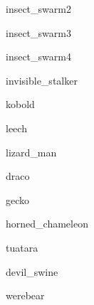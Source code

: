 \documentclass[letterpaper,serif]{module}
\begin{document}
\begin{newmonster}{insect_swarm2}\end{newmonster}

\begin{newmonster}{insect_swarm3}\end{newmonster}

\begin{newmonster}{insect_swarm4}\end{newmonster}

\begin{newmonster}{invisible_stalker}\end{newmonster}

\begin{newmonster}{kobold}\end{newmonster}

\begin{newmonster}{leech}\end{newmonster}

\begin{newmonster}{lizard_man}\end{newmonster}

\begin{newmonster}{draco}\end{newmonster}

\begin{newmonster}{gecko}\end{newmonster}

\begin{newmonster}{horned_chameleon}\end{newmonster}

\begin{newmonster}{tuatara}\end{newmonster}

\begin{newmonster}{devil_swine}\end{newmonster}

\begin{newmonster}{werebear}\end{newmonster}
\end{document}

